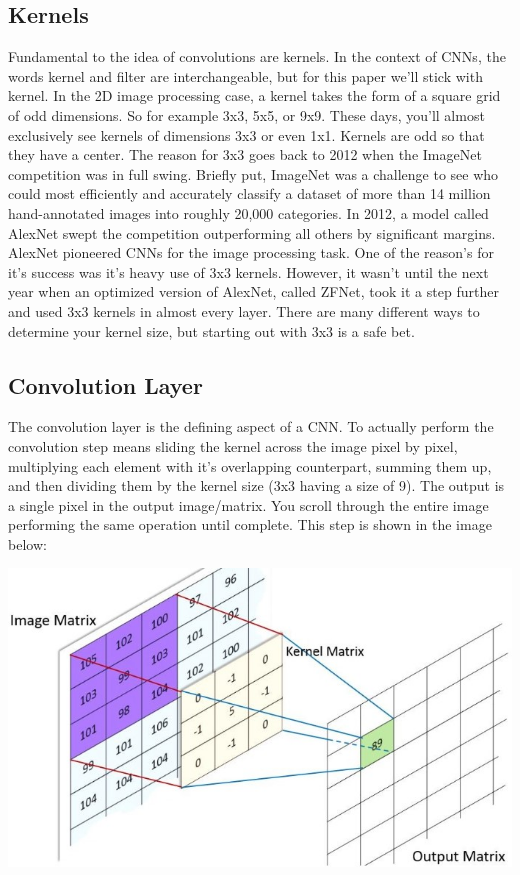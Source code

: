 \documentclass{article}
\begin{document}
    \subsection{Kernels}
        Fundamental to the idea of convolutions are kernels. In the context of CNNs, the words kernel and filter are interchangeable, but for this paper we'll stick with kernel. In the 2D image processing case, a kernel takes the form of a square grid of odd dimensions. So for example 3x3, 5x5, or 9x9. These days, you'll almost exclusively see kernels of dimensions 3x3 or even 1x1. Kernels are odd so that they have a center. The reason for 3x3 goes back to 2012 when the ImageNet competition was in full swing. Briefly put, ImageNet was a challenge to see who could most efficiently and accurately classify a dataset of more than 14 million hand-annotated images into roughly 20,000 categories. In 2012, a model called AlexNet swept the competition outperforming all others by significant margins. AlexNet pioneered CNNs for the image processing task. One of the reason's for it's success was it's heavy use of 3x3 kernels. However, it wasn't until the next year when an optimized version of AlexNet, called ZFNet, took it a step further and used 3x3 kernels in almost every layer. There are many different ways to determine your kernel size, but starting out with 3x3 is a safe bet.
        
    \subsection{Convolution Layer}
        The convolution layer is the defining aspect of a CNN. To actually perform the convolution step means sliding the kernel across the image pixel by pixel, multiplying each element with it's overlapping counterpart, summing them up, and then dividing them by the kernel size (3x3 having a size of 9). The output is a single pixel in the output image/matrix. You scroll through the entire image performing the same operation until complete. This step is shown in the image below:
        
        \begin{center}
            \includegraphics[scale=0.6]{images/kernel.jpg}
        \end{center}
        
\end{document}
